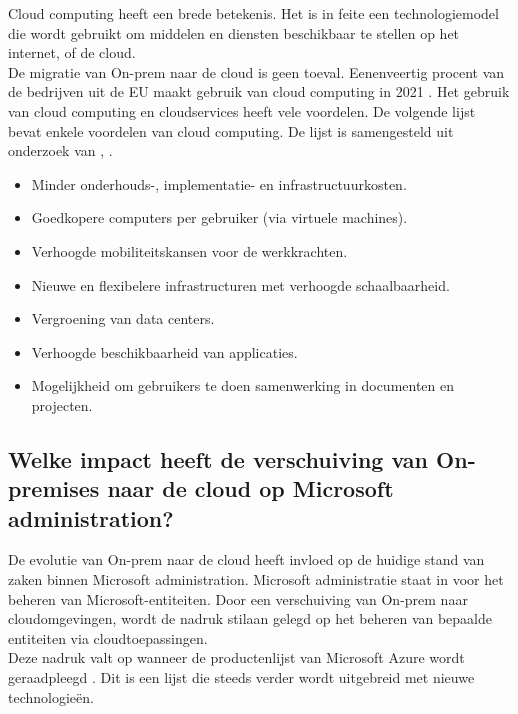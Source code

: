 Cloud computing heeft een brede betekenis. Het is in feite een technologiemodel die wordt gebruikt om middelen en diensten beschikbaar te stellen op het internet, of de cloud. \autocite{Haag2009} \\

De migratie van \ac{On-prem} naar de cloud is geen toeval. Eenenveertig procent van de bedrijven uit de \ac{EU} maakt gebruik van cloud computing in 2021 \autocite{EU2021}. Het gebruik van cloud computing en cloudservices heeft vele voordelen. De volgende lijst bevat enkele voordelen van cloud computing. De lijst is samengesteld uit onderzoek van \textcite{Aljabre2012}, \textcite{Rittinghouse2016}.

\begin{itemize}
    \item Minder onderhouds-, implementatie- en infrastructuurkosten.
    \item Goedkopere computers per gebruiker (via virtuele machines).
    \item Verhoogde mobiliteitskansen voor de werkkrachten.
    \item Nieuwe en flexibelere infrastructuren met verhoogde schaalbaarheid.
    \item Vergroening van data centers.
    \item Verhoogde beschikbaarheid van applicaties.
    \item Mogelijkheid om gebruikers te doen samenwerking in documenten en projecten.
     
\end{itemize}

\subsection{Welke impact heeft de verschuiving van On-premises naar de cloud op Microsoft administration?}


De evolutie van \ac{On-prem} naar de cloud heeft invloed op de huidige stand van zaken binnen Microsoft administration. Microsoft administratie staat in voor het beheren van Microsoft-entiteiten. Door een verschuiving van \ac{On-prem} naar cloudomgevingen, wordt de nadruk stilaan gelegd op het beheren van bepaalde entiteiten via cloudtoepassingen. \\

Deze nadruk valt op wanneer de productenlijst van Microsoft Azure wordt geraadpleegd \autocite{Microsoft2023b}. Dit is een lijst die steeds verder wordt uitgebreid met nieuwe technologieën. \\

